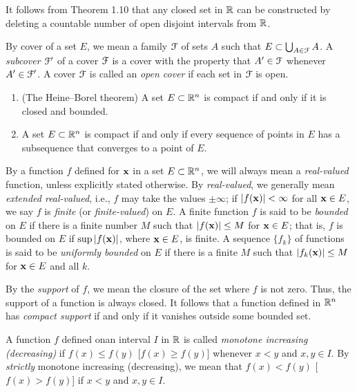 It follows from Theorem 1.10 that any closed set in $\mathbb{R}$ can be
constructed by deleting a countable number of open disjoint intervals from
$\mathbb{R}$.

By cover of a set $E$, we mean a family $\mathcal{F}$ of sets $A$ such that
$E\subset\bigcup_{A\in\mathcal{F}} A$. A \emph{subcover $\mathcal{F}'$} of a cover
$\mathcal{F}$ is a cover with the property that $A'\in\mathcal{F}$ whenever
$A'\in\mathcal{F}'$. A cover $\mathcal{F}$ is called an \emph{open cover} if each set
in $\mathcal{F}$ is open.
\begin{theorem}[1.12]
\begin{enumerate}[label=\textnormal{(\alph*)}]
\item (The Heine--Borel theorem) A set $E\subset\mathbb{R}^n$ is compact if and
  only if it is closed and bounded.
\item A set $E\subset\mathbb{R}^n$ is compact if and only if every sequence of
  points in $E$ has a subsequence that converges to a point of $E$.
\end{enumerate}
\end{theorem}

By a function $f$ defined for $\mathbf{x}$ in a set $E\subset\mathbb{R}^n$, we will
always mean a \emph{real-valued} function, unless explicitly stated
otherwise. By \emph{real-valued}, we generally mean \emph{extended
  real-valued}, i.e., $f$ may take the values $\pm\infty$; if
$|f(\mathbf{x})|<\infty$ for all $\mathbf{x}\in E$, we say $f$ is \emph{finite} (or
\emph{finite-valued}) on $E$. A finite function $f$ is said to be
\emph{bounded} on $E$ if there is a finite number $M$ such that
$|f(\mathbf{x})|\leq M$ for $\mathbf{x}\in E$; that is, $f$ is bounded on $E$ if $\sup
|f(\mathbf{x})|$, where $\mathbf{x}\in E$, is finite. A sequence ${\{f_k\}}$ of
functions is said to be \emph{uniformly bounded} on $E$ if there is a
finite $M$ such that $|f_k(\mathbf{x})|\leq M$ for $\mathbf{x}\in E$ and all $k$.

By the \emph{support} of $f$, we mean the closure of the set where $f$ is
not zero. Thus, the support of a function is always closed. It follows that
a function defined in $\mathbb{R}^n$ has \emph{compact support} if and only if it
vanishes outside some bounded set.

A function $f$ defined onan interval $I$ in $\mathbb{R}$ is called \emph{monotone
increasing (decreasing)} if $f(x)\leq f(y)$ [$f(x)\geq f(y)$] whenever
$x<y$ and $x,y\in I$. By \emph{strictly} monotone increasing (decreasing),
we mean that $f(x)<f(y)$ [$f(x)>f(y)$] if $x<y$ and $x,y\in I$.

